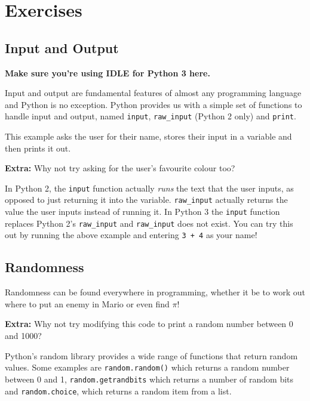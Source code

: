 \section{Exercises}
	\subsection{Input and Output}
		\textbf{Make sure you're using IDLE for Python 3 here.}

		Input and output are fundamental features of almost any programming language and Python is no exception. Python provides us with a simple set of functions to handle input and output, named \texttt{input}, \texttt{raw\_input} (Python 2 only) and \texttt{print}.

		

		This example asks the user for their name, stores their input in a variable and then prints it out.

		\textbf{Extra:} Why not try asking for the user's favourite colour too?

		\begin{aside}
			In Python 2, the \texttt{input} function actually \textit{runs} the text that the user inputs, as opposed to just returning it into the variable. \texttt{raw\_input} actually returns the value the user inputs instead of running it. In Python 3 the \texttt{input} function replaces Python 2's \texttt{raw\_input} and \texttt{raw\_input} does not exist. You can try this out by running the above example and entering \texttt{3 + 4} as your name!
		\end{aside}

	\subsection{Randomness}

		Randomness can be found everywhere in programming, whether it be to work out where to put an enemy in Mario or even find $\pi$!

		

		\textbf{Extra:} Why not try modifying this code to print a random number between 0 and 1000?

		\begin{aside}
			Python's random library provides a wide range of functions that return random values. Some examples are \texttt{random.random()} which returns a random number between 0 and 1, \texttt{random.getrandbits} which returns a number of random bits and \texttt{random.choice}, which returns a random item from a list.
		\end{aside}

